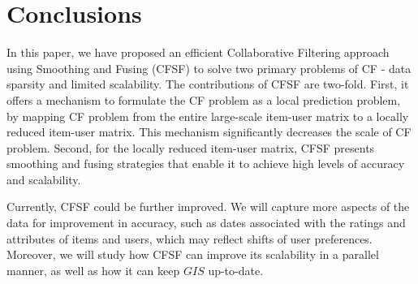 \section{Conclusions}\label{sec:conclusion}

In this paper, we have proposed an efficient Collaborative Filtering
approach using Smoothing and Fusing (CFSF) to solve two primary
problems of CF - data sparsity and limited scalability. The
contributions of CFSF are two-fold. First, it offers a mechanism to
formulate the CF problem as a local prediction problem, by mapping CF
problem from the entire large-scale item-user matrix to a locally
reduced item-user matrix. This mechanism significantly decreases the
scale of CF problem. Second, for the locally reduced item-user matrix,
CFSF presents smoothing and fusing strategies that enable it to achieve
high levels of accuracy and scalability.

Currently, CFSF could be further improved. We will capture more aspects
of the data for improvement in accuracy, such as dates associated with
the ratings and attributes of items and users, which may reflect shifts
of user preferences. Moreover, we will study how CFSF can improve its
scalability in a parallel manner, as well as how it can keep $GIS$
up-to-date.
